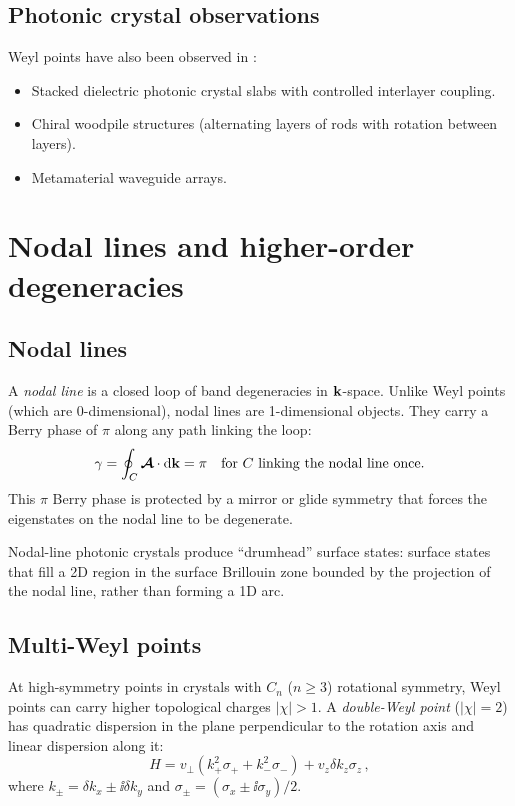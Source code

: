 \subsection{Photonic crystal observations}
\label{sec:ch15-photonic-obs}

Weyl points have also been observed in
\cite{ozawa2018topological,noh2017experimental}:
\begin{itemize}
  \item Stacked dielectric photonic crystal slabs with controlled
  interlayer coupling.
  \item Chiral woodpile structures (alternating layers of rods with
  rotation between layers).
  \item Metamaterial waveguide arrays.
\end{itemize}

\section{Nodal lines and higher-order degeneracies}
\label{sec:ch15-nodal}

\subsection{Nodal lines}
\label{sec:ch15-nodal-lines}

A \emph{nodal line} is a closed loop of band degeneracies in
$\mathbf{k}$-space.  Unlike Weyl points (which are 0-dimensional), nodal
lines are 1-dimensional objects.  They carry a Berry phase of $\pi$
along any path linking the loop:
\begin{equation}\label{eq:ch15-nodal-berry}
  \gamma = \oint_C\boldsymbol{\mathcal{A}}\cdot\mathrm{d}\mathbf{k} = \pi
  \quad\text{for } C \text{ linking the nodal line once.}
\end{equation}
This $\pi$ Berry phase is protected by a mirror or glide symmetry that
forces the eigenstates on the nodal line to be degenerate.

Nodal-line photonic crystals produce ``drumhead'' surface states:
surface states that fill a 2D region in the surface Brillouin zone
bounded by the projection of the nodal line, rather than forming a 1D
arc.

\subsection{Multi-Weyl points}
\label{sec:ch15-multi-weyl}

At high-symmetry points in crystals with $C_n$ ($n\geq 3$) rotational
symmetry, Weyl points can carry higher topological charges $|\chi|>1$.
A \emph{double-Weyl point} ($|\chi|=2$) has quadratic dispersion in
the plane perpendicular to the rotation axis and linear dispersion
along it:
\begin{equation}\label{eq:ch15-double-weyl}
  H = v_\perp(k_+^2\sigma_+ + k_-^2\sigma_-) + v_z\delta k_z\sigma_z\,,
\end{equation}
where $k_\pm=\delta k_x\pm\ii\delta k_y$ and
$\sigma_\pm=(\sigma_x\pm\ii\sigma_y)/2$.

